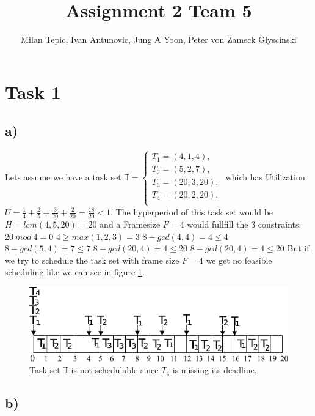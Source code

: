 \documentclass[10pt,a4paper]{article}
\author{Milan Tepic, Ivan Antunovic, Jung A Yoon, Peter von Zameck Glyscinski}
\title{Assignment 2 Team 5}
\begin{document}
\maketitle

\section*{Task 1}
\subsection*{a)}
Lets assume we have a task set $\mathbb{T}= \left\{ \begin{array}{c}
											T_1=(4,1,4),\\
											T_2=(5,2,7),\\
											T_3=(20,3,20),\\
											T_4=(20,2,20),\\
											\end{array}\right.$
which has Utilization $U = \frac{1}{4} + \frac{2}{5} + \frac{3}{20} + \frac{2}{20} = \frac{18}{20} < 1$.
The hyperperiod of this task set would be $H= lcm(4, 5, 20) = 20$ and a Framesize $F=4$ would fullfill the 3 constraints:
\newline
$20 ~mod ~4 = 0$
\newline
$4 \geq max(1, 2, 3) = 3$
\newline
$8 - gcd(4, 4) = 4 \leq 4$
\newline
$8 - gcd(5, 4) = 7 \leq 7$
\newline
$8 - gcd(20, 4) = 4 \leq 20$
\newline
$8 - gcd(20, 4) = 4 \leq 20$
\newline 
But if we try to schedule the task set with frame size $F = 4$ we get no feasible scheduling like we can see in figure \ref{fig:1a}.

\begin{figure}[h]
\includegraphics[width=\linewidth]{timing-diagram1a.pdf}
\caption{Task set $\mathbb{T}$ is not schedulable since $T_4$ is missing its deadline.} 
\label{fig:1a}
\end{figure}
\subsection*{b)}
\end{document}
